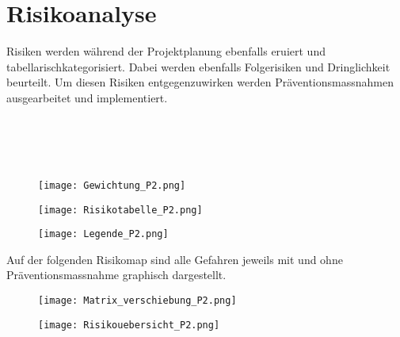 \section{Risikoanalyse}

Risiken werden während der Projektplanung ebenfalls eruiert und tabellarischkategorisiert. Dabei werden ebenfalls Folgerisiken und Dringlichkeit beurteilt. Um diesen Risiken entgegenzuwirken werden Präventionsmassnahmen ausgearbeitet und implementiert. 
\\
\\
\\
\\
\\

\begin{figure}[H]
	\centering
	\texttt{[image: Gewichtung\_P2.png]}
	\label{fig:Gewichtung}
\end{figure}

\newpage



\begin{figure}[H]
\centering
\texttt{[image: Risikotabelle\_P2.png]}
\label{fig:Risikotabell}
\end{figure}

\newpage
\begin{figure}[H]
	\centering
	\texttt{[image: Legende\_P2.png]}
	\label{fig:Tabelle}
\end{figure}







Auf der folgenden Risikomap sind alle Gefahren jeweils mit und ohne Präventionsmassnahme graphisch dargestellt.

\begin{figure}[H]
	\centering
	\texttt{[image: Matrix\_verschiebung\_P2.png]}
	\label{fig:Matrix_verschiebung}
\end{figure}


\begin{figure}[H]
	\centering
	\texttt{[image: Risikouebersicht\_P2.png]}
	\label{fig:Risikoüebersicht}
\end{figure}
